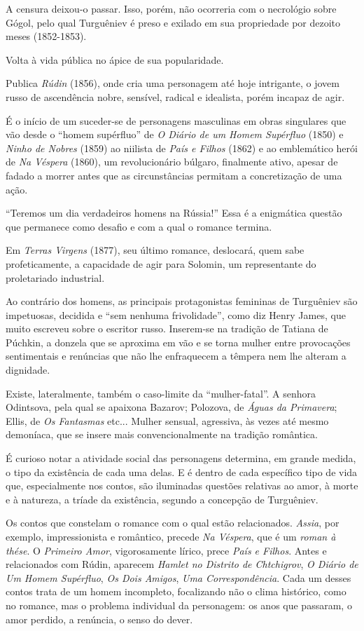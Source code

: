 A censura deixou-o passar. Isso, porém, não ocorreria com o necrológio
sobre Gógol, pelo qual Turguêniev é preso e exilado em sua propriedade
por dezoito meses (1852-1853).

Volta à vida pública no ápice de sua popularidade.

Publica \emph{Rúdin} (1856), onde cria uma personagem até hoje
intrigante, o jovem russo de ascendência nobre, sensível, radical e
idealista, porém incapaz de agir.

É o início de um suceder-se de personagens masculinas em obras
singulares que vão desde o ``homem supérfluo'' de \emph{O Diário de um
Homem Supérfluo} (1850) e \emph{Ninho de Nobres} (1859) ao niilista de
\emph{País e Filhos} (1862) e ao emblemático herói de \emph{Na Véspera}
(1860), um revolucionário búlgaro, finalmente ativo, apesar de fadado a
morrer antes que as circunstâncias permitam a concretização de uma ação.

``Teremos um dia verdadeiros homens na Rússia!'' Essa é a enigmática
questão que permanece como desafio e com a qual o romance termina.

Em \emph{Terras Virgens} (1877), seu último romance, deslocará, quem
sabe profeticamente, a capacidade de agir para Solomin, um representante
do proletariado industrial.

Ao contrário dos homens, as principais protagonistas femininas de
Turguêniev são impetuosas, decidida e ``sem nenhuma frivolidade'', como
diz Henry James, que muito escreveu sobre o escritor russo. Inserem-se
na tradição de Tatiana de Púchkin, a donzela que se aproxima em vão e se
torna mulher entre provocações sentimentais e renúncias que não lhe
enfraquecem a têmpera nem lhe alteram a dignidade.

Existe, lateralmente, também o caso-limite da ``mulher-fatal''. A
senhora Odintsova, pela qual se apaixona Bazarov; Polozova, de
\emph{Águas da Primavera}; Ellis, de \emph{Os Fantasmas} etc... Mulher
sensual, agressiva, às vezes até mesmo demoníaca, que se insere mais
convencionalmente na tradição romântica.

É curioso notar a atividade social das personagens determina, em grande
medida, o tipo da existência de cada uma delas. E é dentro de cada
específico tipo de vida que, especialmente nos contos, são iluminadas
questões relativas ao amor, à morte e à natureza, a tríade da
existência, segundo a concepção de Turguêniev.

Os contos que constelam o romance com o qual estão relacionados.
\emph{Assia}, por exemplo, impressionista e romântico, precede \emph{Na
Véspera}, que é um \emph{roman à thése}. O \emph{Primeiro Amor},
vigorosamente lírico, prece \emph{País e Filhos}. Antes e relacionados
com Rúdin, aparecem \emph{Hamlet no Distrito de Chtchigrov}, \emph{O
Diário de Um Homem Supérfluo}, \emph{Os Dois Amigos}, \emph{Uma
Correspondência}. Cada um desses contos trata de um homem incompleto,
focalizando não o clima histórico, como no romance, mas o problema
individual da personagem: os anos que passaram, o amor perdido, a
renúncia, o senso do dever.

